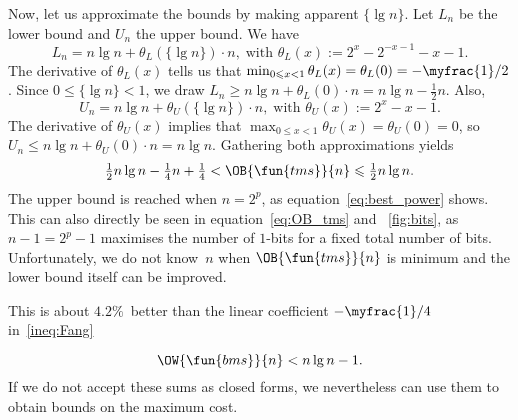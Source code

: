 Now, let us approximate the bounds by making apparent \(\{\lg
n\}\). Let \(L_n\) be the lower bound and \(U_n\) the upper bound. We
have
\begin{equation*}
L_n = n\lg n + \theta_L(\{\lg n\}) \cdot n,\; \text{with
  \(\theta_L(x) := 2^x - 2^{-x-1} - x - 1\)}.
\end{equation*}
The derivative of \(\theta_L(x)\) tells us that \(\min_{0 \leqslant x
  < 1}\theta_L(x) = \theta_L(0) = -\myfrac{1}/{2}\). Since \(0
\leqslant \{\lg n\} < 1\), we draw \(L_n \geqslant n\lg n +
\theta_L(0) \cdot n = n\lg n - \frac{1}{2}n\). Also,
\begin{equation*}
U_n = n\lg n + \theta_U(\{\lg n\}) \cdot n,\; \text{with
  \(\theta_U(x) := 2^x - x - 1\)}.
\end{equation*}
The derivative of \(\theta_U(x)\) implies that \(\max_{0 \leqslant x <
  1}\theta_U(x) = \theta_U(0) = 0\), so \(U_n \leqslant n\lg n +
\theta_U(0) \cdot n = n\lg n\). Gathering both approximations yields
\begin{equation}
\tfrac{1}{2}n\lg n - \tfrac{1}{4}n + \tfrac{1}{4}
< \OB{\fun{tms}}{n} \leqslant
\tfrac{1}{2}n\lg n.
\label{ineq:Fang}\index{tms@$\OB{\fun{tms}}{n}$}
\end{equation}
The upper bound is reached when \(n=2^p\), as
equation~\eqref{eq:best_power}  shows. This
can also directly be seen in equation~\eqref{eq:OB_tms}
 and \fig~\vref{fig:bits}, as \(n-1=2^p-1\)
maximises the number of \(1\)-bits for a fixed total number of
bits. Unfortunately, we do not know~\(n\) when
\(\OB{\fun{tms}}{n}\) is minimum and
the lower bound itself can be improved.


This is about \(4.2\%\)~better than the linear coefficient
\(-\myfrac{1}/{4}\) in~\eqref{ineq:Fang}


\begin{equation}
\OW{\fun{bms}}{n} < n\lg n - 1.
\label{ineq:OWbms_up}
\end{equation}
 If we do not accept these sums as closed
forms, we nevertheless can use them to obtain bounds on the maximum
cost.

